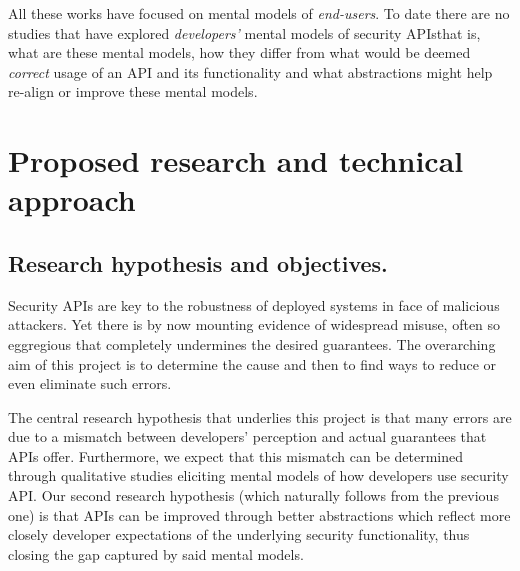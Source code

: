 \documentclass[10pt]{article}
\begin{document}
\begin{mdframed}

All these works have focused on mental models of \emph{end-users}. To date there are no studies that have explored \emph{developers'} mental models of security APIs\textemdash that is, what are these mental models, how they differ from what would be deemed \emph{correct} usage of an API and its functionality and what abstractions might help re-align or improve these mental models.  
\end{mdframed}


\section{Proposed research and technical approach}





%

\subsection*{Research hypothesis and objectives.}

Security APIs are key to the robustness of deployed systems in face of malicious attackers. 
Yet there is by now mounting evidence of widespread misuse, often so eggregious that  completely undermines the desired guarantees.  The overarching aim of this project is to determine the cause and then to find ways to reduce or even eliminate such errors. 

The central research hypothesis that underlies this project is that many errors are due to a mismatch between developers' perception and actual guarantees that APIs offer. Furthermore, we expect that this mismatch can be determined through qualitative studies eliciting mental models of how developers use security API.
Our second research hypothesis (which naturally follows from the previous one) is that APIs can be improved through better abstractions which reflect more closely developer expectations of the underlying security functionality, thus closing the gap captured by said mental models.  
\end{document}
